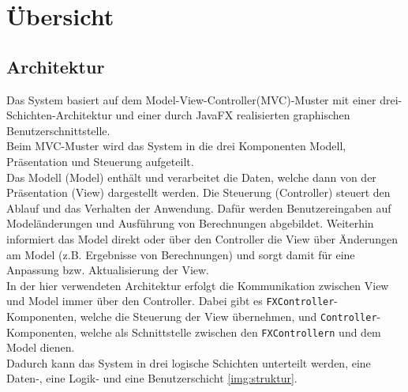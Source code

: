 	\section{Übersicht}
	\subsection{Architektur}
	Das System basiert auf dem Model-View-Controller(MVC)-Muster mit einer drei-Schichten-Architektur und einer durch JavaFX realisierten graphischen Benutzerschnittstelle.\\	
	 Beim MVC-Muster wird das System in die drei Komponenten Modell, Präsentation und Steuerung aufgeteilt.\\
	Das Modell (Model) enthält und verarbeitet die Daten, welche dann von der Präsentation (View) dargestellt werden. Die Steuerung (Controller) steuert den Ablauf und das Verhalten der Anwendung. Dafür werden Benutzereingaben auf Modeländerungen und Ausführung von Berechnungen abgebildet. Weiterhin informiert das Model direkt oder über den Controller die View über Änderungen am Model (z.B. Ergebnisse von Berechnungen) und sorgt damit für eine Anpassung bzw. Aktualisierung der View.\\
	In der hier verwendeten Architektur erfolgt die Kommunikation zwischen View und Model immer über den Controller. Dabei gibt es \texttt{FXController}-Komponenten, welche die Steuerung der View übernehmen, und \texttt{Controller}-Komponenten, welche als Schnittstelle zwischen den \texttt{FXControllern} und dem Model dienen.\\
	Dadurch kann das System in drei logische Schichten unterteilt werden, eine Daten-, eine Logik- und eine Benutzerschicht \ref{img:struktur}.
		
	
	
